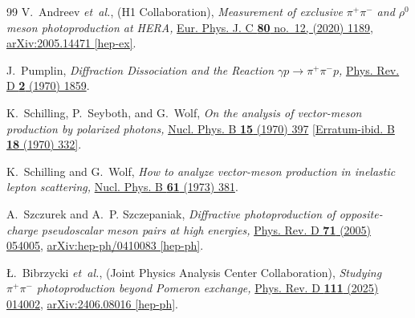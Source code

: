 \documentclass[a4paper,11pt]{article}
\begin{document}
\begin{thebibliography}{99}
V.~Andreev {\em et~al.}, (H1 Collaboration), {\em {Measurement of exclusive
  $\pi^{+}\pi^{-}$ and $\rho^0$ meson photoproduction at HERA},}
  \href{http://dx.doi.org/10.1140/epjc/s10052-020-08587-3}{Eur. Phys. J. C
  {\bfseries 80} no.~12, (2020) 1189},
  \href{https://arxiv.org/abs/2005.14471v4}{{arXiv:2005.14471 [hep-ex]}}.
  
J.~Pumplin, 
{\em {Diffraction Dissociation and the Reaction $\gamma p \to \pi^{+} \pi^{-} p$},}
\href{https://doi.org/10.1103/PhysRevD.2.1859}{Phys. Rev. D {\bfseries 2} (1970) 1859}.
  
K.~Schilling, P.~Seyboth, and G.~Wolf, {\em {On the analysis of vector-meson production by polarized photons},}
\href{http://dx.doi.org/10.1016/0550-3213(70)90070-2}{Nucl. Phys. B {\bfseries 15} (1970) 397} 
\href{http://dx.doi.org/10.1016/0550-3213(70)90295-6}{[Erratum-ibid. B {\bfseries 18} (1970) 332]}.
  
K.~Schilling and G.~Wolf, {\em {How to analyze vector-meson production in inelastic lepton scattering},}
\href{http://dx.doi.org/10.1016/0550-3213(73)90371-4}{Nucl. Phys. B {\bfseries 61} (1973) 381}.
  
A.~Szczurek and A.~P. Szczepaniak, {\em {Diffractive photoproduction of
  opposite-charge pseudoscalar meson pairs at high energies},}
  \href{http://dx.doi.org/10.1103/PhysRevD.71.054005}{Phys. Rev. D {\bfseries 71} (2005) 054005},
\href{http://arxiv.org/abs/hep-ph/0410083}{{arXiv:hep-ph/0410083 [hep-ph]}}.
  
{\L}.~Bibrzycki \textit{et~al.}, (Joint Physics Analysis Center Collaboration), {\em {Studying $\pi^{+} \pi^{-}$ photoproduction beyond Pomeron exchange},}
\href{https://doi.org/10.1103/PhysRevD.111.014002}{Phys. Rev. D {\bfseries 111} (2025) 014002},
\href{http://arxiv.org/abs/2406.08016}{{arXiv:2406.08016 [hep-ph]}}.

\end{thebibliography}
\end{document}
